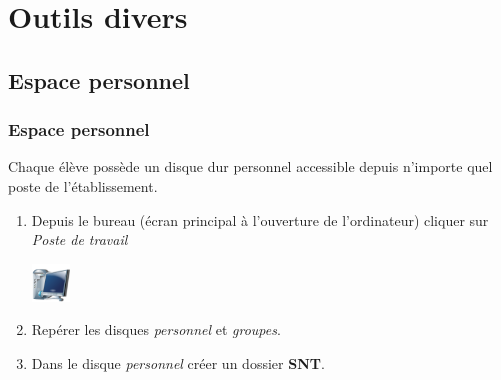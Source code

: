\documentclass[svgnames,11pt]{beamer}
\begin{document}
\section{Outils divers}
\subsection{Espace personnel}
\begin{frame}
    \frametitle{Espace personnel}

Chaque élève possède un disque dur personnel accessible depuis n'importe quel poste de l'établissement.
\begin{activite}
\begin{enumerate}
    \item Depuis le bureau (écran principal à l'ouverture de l'ordinateur) cliquer sur \emph{Poste de travail}
    \begin{center}
    \centering
    \includegraphics[width=1cm]{ressources/poste.png}
    \end{center}
    \item Repérer les disques \emph{personnel} et \emph{groupes}.
    \item Dans le disque \emph{personnel} créer un dossier \textbf{SNT}.
\end{enumerate}
\end{activite}

\end{frame}
\end{document}
